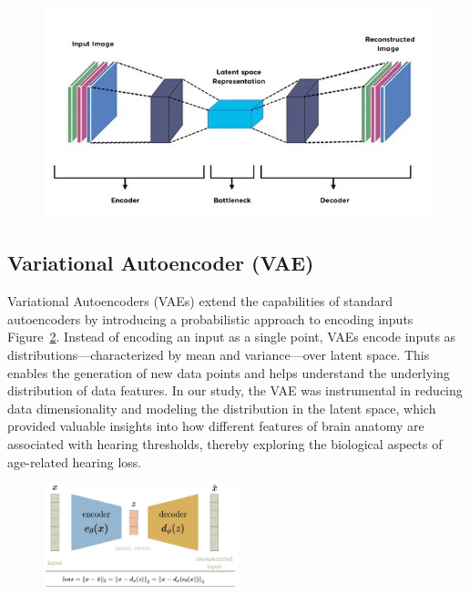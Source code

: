 \documentclass[conference,compsoc]{IEEEtran}
\begin{document}
\begin{figure}[htbp]
	\centering
	\includegraphics[width=\textwidth]{AE.jpg}
	\caption{}
	\label{ae}
\end{figure}

    
\subsection{Variational Autoencoder (VAE)} Variational Autoencoders (VAEs) extend the capabilities of standard autoencoders by introducing a probabilistic approach to encoding inputs Figure~\ref{vae}. Instead of encoding an input as a single point, VAEs encode inputs as distributions—characterized by mean and variance—over latent space. This enables the generation of new data points and helps understand the underlying distribution of data features. In our study, the VAE was instrumental in reducing data dimensionality and modeling the distribution in the latent space, which provided valuable insights into how different features of brain anatomy are associated with hearing thresholds, thereby exploring the biological aspects of age-related hearing loss.

\begin{figure}[htbp]
	\centering
	\includegraphics[width=0.5\textwidth]{VAE.jpg}
	\caption{}
	\label{vae}
\end{figure}
\end{document}
